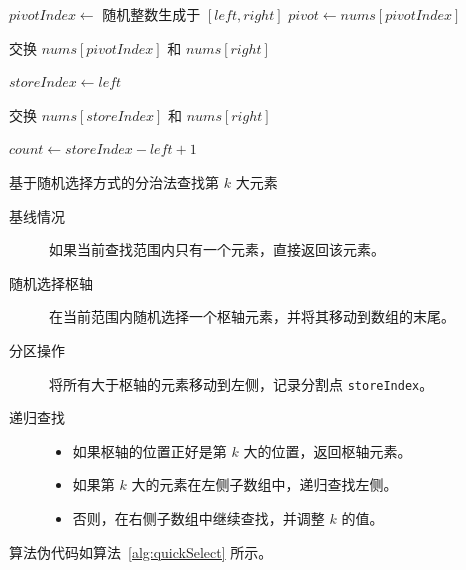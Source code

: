 \begin{algorithm}[htbp]
    \label{alg:quickSelect}
    \SetAlgoLined
    
    
    $pivotIndex \leftarrow$ 随机整数生成于 $[left, right]$ \;
    $pivot \leftarrow nums[pivotIndex]$\;
    
    交换 $nums[pivotIndex]$ 和 $nums[right]$\;
    
    $storeIndex \leftarrow left$\;
    
    交换 $nums[storeIndex]$ 和 $nums[right]$\;
    
    $count \leftarrow storeIndex - left + 1$\;
    
    \caption{基于随机选择方式的分治法查找第 $k$ 大元素}
    \end{algorithm}    
    \begin{description}
        \item[基线情况] 如果当前查找范围内只有一个元素，直接返回该元素。
        \item[随机选择枢轴] 在当前范围内随机选择一个枢轴元素，并将其移动到数组的末尾。
        \item[分区操作] 将所有大于枢轴的元素移动到左侧，记录分割点 \texttt{storeIndex}。
        \item[递归查找] \begin{itemize}
            \item 如果枢轴的位置正好是第 $k$ 大的位置，返回枢轴元素。
            \item 如果第 $k$ 大的元素在左侧子数组中，递归查找左侧。
            \item 否则，在右侧子数组中继续查找，并调整 $k$ 的值。
        \end{itemize}
    \end{description}
    算法伪代码如算法~\autoref{alg:quickSelect} 所示。
